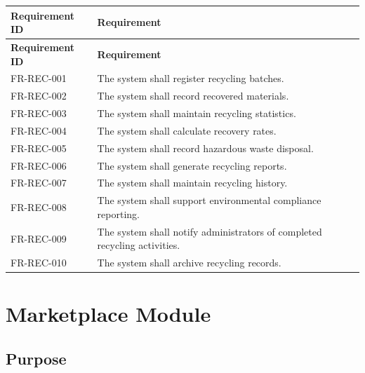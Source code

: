 \begin{longtable}{|p{3cm}|p{10.2cm}|}

\hline
\textbf{Requirement ID} &
\textbf{Requirement}\\
\hline
\endfirsthead

\hline
\textbf{Requirement ID} &
\textbf{Requirement}\\
\hline
\endhead

FR-REC-001 &
The system shall register recycling batches.\\
\hline

FR-REC-002 &
The system shall record recovered materials.\\
\hline

FR-REC-003 &
The system shall maintain recycling statistics.\\
\hline

FR-REC-004 &
The system shall calculate recovery rates.\\
\hline

FR-REC-005 &
The system shall record hazardous waste disposal.\\
\hline

FR-REC-006 &
The system shall generate recycling reports.\\
\hline

FR-REC-007 &
The system shall maintain recycling history.\\
\hline

FR-REC-008 &
The system shall support environmental compliance reporting.\\
\hline

FR-REC-009 &
The system shall notify administrators of completed recycling activities.\\
\hline

FR-REC-010 &
The system shall archive recycling records.\\
\hline

\end{longtable}

\section{Marketplace Module}
\label{sec:marketplace}

\subsection{Purpose}

